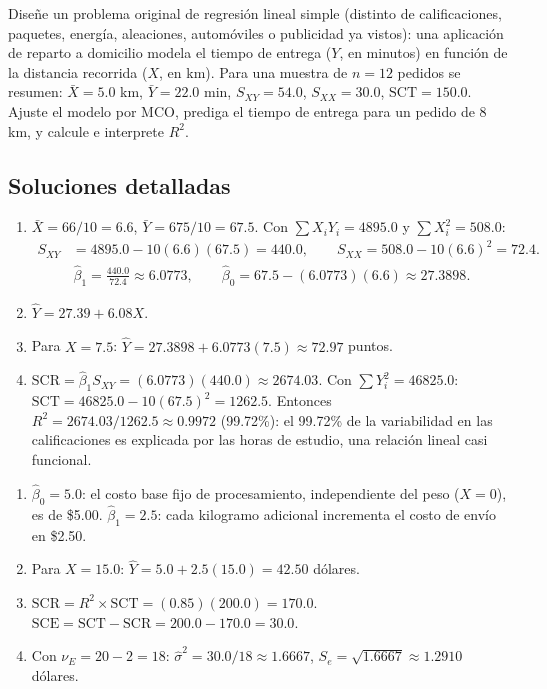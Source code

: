 \begin{problema}
	\label{prob:58d3723}
	Diseñe un problema original de regresión lineal simple (distinto de calificaciones, paquetes, energía, aleaciones, automóviles o publicidad ya vistos): una aplicación de reparto a domicilio modela el tiempo de entrega ($Y$, en minutos) en función de la distancia recorrida ($X$, en km). Para una muestra de $n=12$ pedidos se resumen: $\bar{X}=5.0$ km, $\bar{Y}=22.0$ min, $S_{XY}=54.0$, $S_{XX}=30.0$, $\text{SCT}=150.0$. Ajuste el modelo por MCO, prediga el tiempo de entrega para un pedido de $8$ km, y calcule e interprete $R^2$.
\end{problema}

\subsection*{Soluciones detalladas}

\begin{solproblema}[prob:ab5bf4a]
	\begin{enumerate}
		\item $\bar{X}=66/10=6.6$, $\bar{Y}=675/10=67.5$. Con $\sum X_iY_i=4895.0$ y $\sum X_i^2=508.0$:
		\begin{align}
			S_{XY} &= 4895.0-10(6.6)(67.5) = 440.0, \qquad S_{XX} = 508.0-10(6.6)^2 = 72.4.
		\end{align}
		\begin{align}
			\hat{\beta}_1 = \frac{440.0}{72.4} \approx 6.0773, \qquad \hat{\beta}_0 = 67.5-(6.0773)(6.6) \approx 27.3898.
		\end{align}
		\item $\hat{Y} = 27.39+6.08X$.
		\item Para $X=7.5$: $\hat{Y} = 27.3898+6.0773(7.5) \approx 72.97$ puntos.
		\item $\text{SCR}=\hat{\beta}_1S_{XY}=(6.0773)(440.0)\approx2674.03$. Con $\sum Y_i^2=46825.0$: $\text{SCT}=46825.0-10(67.5)^2=1262.5$. Entonces $R^2=2674.03/1262.5\approx0.9972$ (99.72\%): el 99.72\% de la variabilidad en las calificaciones es explicada por las horas de estudio, una relación lineal casi funcional.
	\end{enumerate}
\end{solproblema}

\begin{solproblema}[prob:e5cf043]
	\begin{enumerate}
		\item $\hat{\beta}_0=5.0$: el costo base fijo de procesamiento, independiente del peso ($X=0$), es de \$5.00. $\hat{\beta}_1=2.5$: cada kilogramo adicional incrementa el costo de envío en \$2.50.
		\item Para $X=15.0$: $\hat{Y}=5.0+2.5(15.0)=42.50$ dólares.
		\item $\text{SCR}=R^2\times\text{SCT}=(0.85)(200.0)=170.0$. $\text{SCE}=\text{SCT}-\text{SCR}=200.0-170.0=30.0$.
		\item Con $\nu_E=20-2=18$: $\hat{\sigma}^2=30.0/18\approx1.6667$, $S_e=\sqrt{1.6667}\approx1.2910$ dólares.
	\end{enumerate}
\end{solproblema}

